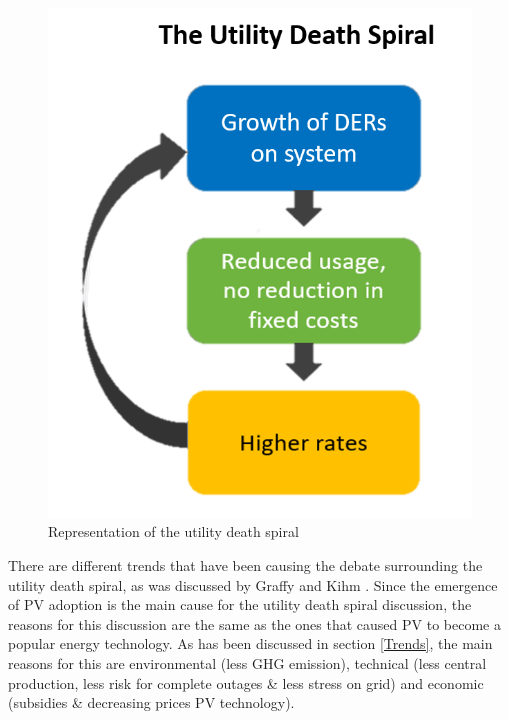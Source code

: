 \begin{figure}[h!]
\centering
\includegraphics[width=4m]{UtilityDeathSpiral.png}
\caption[Representation of the utility death spiral]{Representation of the utility death spiral \cite{spiral}}
\label{Figure:spiral}
\end{figure}
There are different trends that have been causing the debate surrounding the utility death spiral, as was discussed by Graffy and Kihm \cite{spiralcauses}. Since the emergence of PV adoption is the main cause for the utility death spiral discussion, the reasons for this discussion are the same as the ones that caused PV to become a popular energy technology. As has been discussed in section \ref{Trends}, the main reasons for this are environmental (less GHG emission), technical (less central production, less risk for complete outages \& less stress on grid) and economic (subsidies \& decreasing prices PV technology).
\noindent

